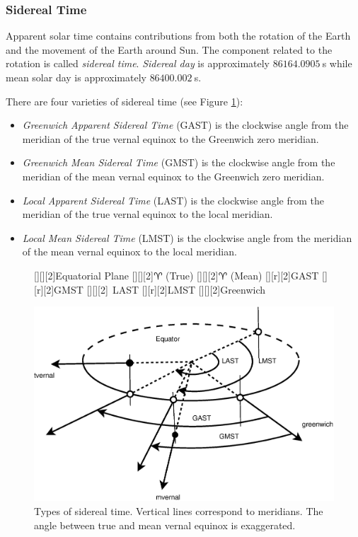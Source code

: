 \documentclass [12pt, a4paper] {article}
\begin{document}
\subsubsection{Sidereal Time}
Apparent solar time contains contributions from both the rotation of the Earth and the
movement of the Earth around Sun. The component related to the rotation is called 
\emph{sidereal time}. \emph{Sidereal day} is approximately $86164.0905\:$s while mean solar
day is approximately $86400.002\:$s. 

There are four varieties of sidereal time (see Figure \ref{fig:sidereal}): 
\begin {itemize}
  \item \emph{Greenwich Apparent Sidereal Time} (GAST) is the clockwise angle from the meridian 
  of the true vernal equinox to the Greenwich zero meridian.
  \item \emph{Greenwich Mean Sidereal Time} (GMST) is the clockwise angle from the meridian 
  of the mean vernal equinox to the Greenwich zero meridian.
  \item \emph{Local Apparent Sidereal Time} (LAST) is the clockwise angle from the meridian of 
  the true vernal equinox to the local meridian.
  \item \emph{Local Mean Sidereal Time} (LMST) is the clockwise angle from the meridian of the 
  mean vernal equinox to the local meridian. 
\end {itemize}
\begin {figure}
  \begin {center}
    [][][2]{Equatorial Plane}
    [][][2]{$\aries$ (True)}
    [][][2]{$\aries$ (Mean)}
    [][r][2]{GAST}
    [][r][2]{GMST}
    [][][2]{$\:\:$LAST}
    [][r][2]{LMST}
    [][][2]{Greenwich}
 
     \includegraphics [angle=0, width=0.75\columnwidth] {figures/GAST.eps}
     \caption{\label{fig:sidereal}Types of sidereal time. Vertical lines correspond 
     to meridians. The angle between true and mean vernal equinox is exaggerated.}
  \end {center}
\end {figure} 
\end{document}
